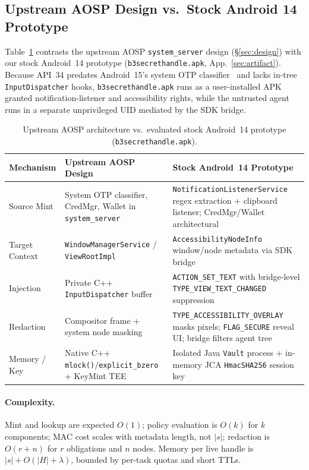 \subsection{Upstream AOSP Design vs.\ Stock Android 14 Prototype}
\label{sec:aosp_vs_stock}

Table~\ref{tab:aosp_vs_stock} contrasts the upstream AOSP \texttt{system\_server} design (\S\ref{sec:design}) with our stock Android~14 prototype (\texttt{b3secrethandle.apk}, App.~\ref{sec:artifact}). Because API~34 predates Android~15's system OTP classifier~\cite{android15privacy} and lacks in-tree \texttt{InputDispatcher} hooks, \texttt{b3secrethandle.apk} runs as a user-installed APK granted notification-listener and accessibility rights, while the untrusted agent runs in a separate unprivileged UID mediated by the SDK bridge.

\begin{table}[t]
\centering
\caption{Upstream AOSP architecture vs.\ evaluated stock Android~14 prototype (\texttt{b3secrethandle.apk}).}
\label{tab:aosp_vs_stock}
\footnotesize
\renewcommand{\arraystretch}{1.05}
\begin{tabularx}{\columnwidth}{@{}>{\raggedright\arraybackslash}p{1.5cm}>{\raggedright\arraybackslash}p{2.7cm}>{\raggedright\arraybackslash}X@{}}
\toprule
Mechanism & Upstream AOSP Design & Stock Android~14 Prototype \\
\midrule
Source Mint & System OTP classifier, CredMgr, Wallet in \texttt{system\_server} & \texttt{Notification\allowbreak ListenerService} regex extraction + clipboard listener; CredMgr/Wallet architectural \\
Target Context & \texttt{Window\allowbreak ManagerService} / \texttt{ViewRootImpl} & \texttt{AccessibilityNodeInfo} window/node metadata via SDK bridge \\
Injection & Private C++ \texttt{InputDispatcher} buffer & \texttt{ACTION\_SET\_TEXT} with bridge-level \texttt{TYPE\_VIEW\_TEXT\_CHANGED} suppression \\
Redaction & Compositor frame + system node masking & \texttt{TYPE\_\allowbreak ACCESSIBILITY\_\allowbreak OVERLAY} masks pixels; \texttt{FLAG\_SECURE} reveal UI; bridge filters agent tree \\
Memory / Key & Native C++ \texttt{mlock()}/\allowbreak\texttt{explicit\_bzero} + KeyMint TEE & Isolated Java \texttt{Vault} process + in-memory JCA \texttt{HmacSHA256} session key \\
\bottomrule
\end{tabularx}
\end{table}

\paragraph{Complexity.} Mint and lookup are expected $O(1)$; policy evaluation is $O(k)$ for $k$ components; MAC cost scales with metadata length, not $|s|$; redaction is $O(r+n)$ for $r$ obligations and $n$ nodes. Memory per live handle is $|s|+O(|H|+\lambda)$, bounded by per-task quotas and short TTLs.

